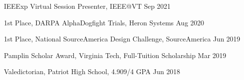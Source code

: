 IEEExp Virtual Session Presenter, IEEE@VT                \hfill                              Sep 2021

1st Place, DARPA AlphaDogfight Trials, Heron Systems       \hfill                        Aug 2020

1st Place, National SourceAmerica Design Challenge, SourceAmerica \hfill                       Jun 2019

Pamplin Scholar Award, Virginia Tech, Full-Tuition Scholarship       \hfill                    Mar 2019

Valedictorian, Patriot High School, 4.909/4 GPA                    \hfill                Jun 2018

